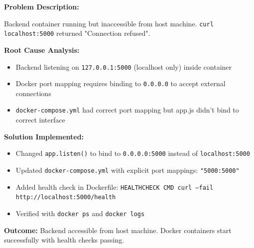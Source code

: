 \documentclass[12pt,a4paper]{article}
\begin{document}
\begin{tcolorbox}[colback=LightBlue, colframe=DarkTeal, title=\textbf{Challenge 8: Docker Container Port Mapping Issues}, fonttitle=\bfseries]

\textbf{Problem Description:}

Backend container running but inaccessible from host machine. \texttt{curl localhost:5000} returned "Connection refused".

\textbf{Root Cause Analysis:}
\begin{itemize}[noitemsep]
  \item Backend listening on \texttt{127.0.0.1:5000} (localhost only) inside container
  \item Docker port mapping requires binding to \texttt{0.0.0.0} to accept external connections
  \item \texttt{docker-compose.yml} had correct port mapping but app.js didn't bind to correct interface
\end{itemize}

\textbf{Solution Implemented:}
\begin{itemize}[noitemsep]
  \item Changed \texttt{app.listen()} to bind to \texttt{0.0.0.0:5000} instead of \texttt{localhost:5000}
  \item Updated \texttt{docker-compose.yml} with explicit port mappings: \texttt{"5000:5000"}
  \item Added health check in Dockerfile: \texttt{HEALTHCHECK CMD curl --fail http://localhost:5000/health}
  \item Verified with \texttt{docker ps} and \texttt{docker logs}
\end{itemize}

\textbf{Outcome:} Backend accessible from host machine. Docker containers start successfully with health checks passing.
\end{tcolorbox}

\vspace{8pt}
\end{document}
